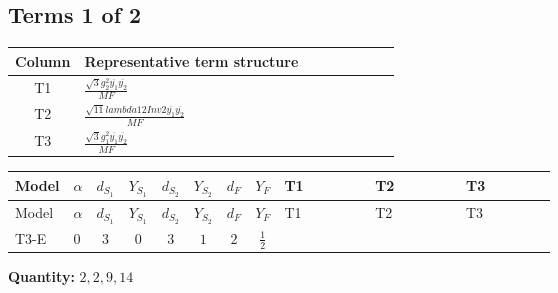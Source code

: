 \documentclass[8pt]{article}
\begin{document}
\begin{landscape}
\subsection*{Terms 1 of 2}
\begin{center}
\begin{tabular}{@{}c >{\raggedright\arraybackslash}p{0.82\linewidth}@{}}
\toprule
Column & Representative term structure \\
\midrule
T1 & \(\displaystyle \frac{\sqrt{3} g_{2}^{2} \overline{y_{1}} \overline{y_{2}}}{MF}\) \\
\midrule
T2 & \(\displaystyle \frac{\sqrt{11} lambda12Inv2 \overline{y_{1}} \overline{y_{2}}}{MF}\) \\
\midrule
T3 & \(\displaystyle \frac{\sqrt{3} g_{1}^{2} \overline{y_{1}} \overline{y_{2}}}{MF}\) \\
\midrule
\bottomrule
\end{tabular}
\end{center}
\smallskip
\tiny
\begin{longtable}{@{}llcccccc >{\raggedright\arraybackslash}p{0.21\linewidth} >{\raggedright\arraybackslash}p{0.21\linewidth} >{\raggedright\arraybackslash}p{0.21\linewidth}@{}}
\toprule
Model & $\alpha$ & $d_{S_1}$ & $Y_{S_1}$ & $d_{S_2}$ & $Y_{S_2}$ & $d_F$ & $Y_F$ & T1 & T2 & T3 \\
\midrule
\endfirsthead
\toprule
Model & $\alpha$ & $d_{S_1}$ & $Y_{S_1}$ & $d_{S_2}$ & $Y_{S_2}$ & $d_F$ & $Y_F$ & T1 & T2 & T3 \\
\midrule
\endhead
T3-E & $0$ & $3$ & $0$ & $3$ & $1$ & $2$ & $\frac{1}{2}$ & \scriptsize\adjustbox{max width=\linewidth}{$\begin{gathered} - \frac{11 \sqrt{3} g_{2}^{2} \overline{y_{1}} \overline{y_{2}}}{8 MF}\end{gathered}$} & \scriptsize\adjustbox{max width=\linewidth}{$\begin{gathered} - \frac{3 \sqrt{11} lambda12Inv2 \overline{y_{1}} \overline{y_{2}}}{22 MF}\end{gathered}$} & \scriptsize\adjustbox{max width=\linewidth}{$\begin{gathered} - \frac{\sqrt{3} g_{1}^{2} \overline{y_{1}} \overline{y_{2}}}{8 MF}\end{gathered}$} \\
\midrule
\bottomrule
\end{longtable}
\clearpage
\noindent\textbf{Quantity: }$\mathrm{2,2,9,14}$\par\smallskip

\end{landscape}
\end{document}
